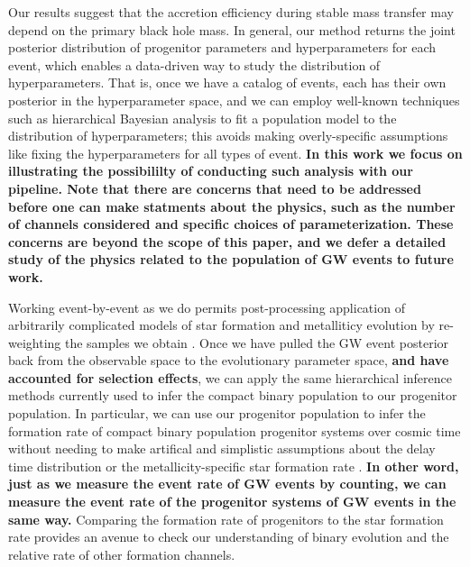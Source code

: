 \documentclass[linenumbers,twocolumn]{aastex631}
\begin{document}
Our results suggest that the accretion efficiency during stable mass transfer
may depend on the primary black hole mass.  In general, our method returns the
joint posterior distribution of progenitor parameters and hyperparameters for
each event, which enables a data-driven way to study the distribution of
hyperparameters.  That is, once we have a catalog of events, each has their own
posterior in the hyperparameter space, and we can employ well-known techniques
such as hierarchical Bayesian analysis to fit a population model to the
distribution of hyperparameters; this avoids making overly-specific assumptions
like fixing the hyperparameters for all types of event. \textbf{In this work we
focus on illustrating the possibililty of conducting such analysis with our
pipeline. Note that there are concerns that need to be addressed before one can
make statments about the physics, such as the number of channels considered and
specific choices of parameterization. These concerns are beyond the scope of
this paper, and we defer a detailed study of the physics related to the
population of GW events to future work.}

Working event-by-event as we do permits post-processing application of
arbitrarily complicated models of star formation and metalliticy evolution by
re-weighting the samples we obtain \citep[e.g.][]{VanSon2022}. Once we have
pulled the GW event posterior back from the observable space to the evolutionary
parameter space, \textbf{and have accounted for selection effects}, we can apply
the same hierarchical inference methods currently used to infer the compact
binary population to our progenitor population.  In particular, we can use our
progenitor population to infer the formation rate of compact binary population
progenitor systems over cosmic time without needing to make artifical and
simplistic assumptions about the delay time distribution or the
metallicity-specific star formation rate \citep{Vitale2019,Ng2021,VanSon2022}.
\textbf{In other word, just as we measure the event rate of GW events by
counting, we can measure the event rate of the progenitor systems of GW events
in the same way.} Comparing the formation rate of progenitors to the star
formation rate provides an avenue to check our understanding of binary evolution
and the relative rate of other formation channels.
\end{document}
